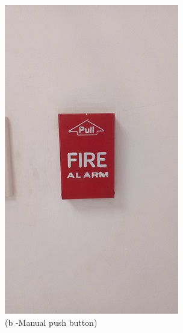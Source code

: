 \begin{figure}
\begin{minipage}[b]{0.2\linewidth}
				\includegraphics[width=\textwidth]{figures/R1P_fdas/manualpullstation}
		\caption*{(b -Manual push button)}
	\end{minipage}
	\hspace{0.05cm}
	\begin{minipage}[b]{0.2\linewidth}
		\centering

\end{minipage}
\end{figure}
